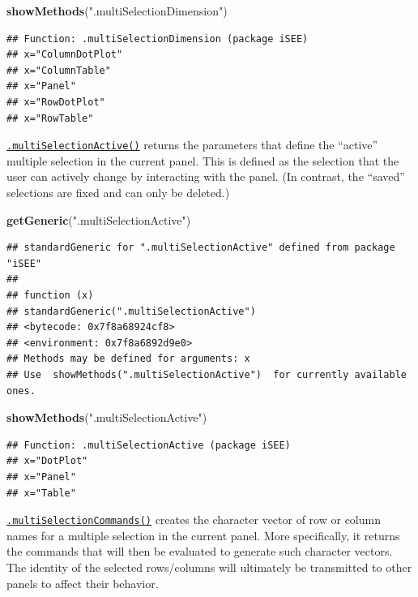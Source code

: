 \documentclass[
]{book}
\newenvironment{Shaded}{\begin{snugshade}}{\end{snugshade}}
\newcommand{\KeywordTok}[1]{\textcolor[rgb]{0.13,0.29,0.53}{\textbf{#1}}}
\newcommand{\NormalTok}[1]{#1}
\newcommand{\StringTok}[1]{\textcolor[rgb]{0.31,0.60,0.02}{#1}}
\begin{document}
\begin{Shaded}
\begin{Highlighting}[]
\KeywordTok{showMethods}\NormalTok{(}\StringTok{".multiSelectionDimension"}\NormalTok{)}
\end{Highlighting}
\end{Shaded}

\begin{verbatim}
## Function: .multiSelectionDimension (package iSEE)
## x="ColumnDotPlot"
## x="ColumnTable"
## x="Panel"
## x="RowDotPlot"
## x="RowTable"
\end{verbatim}

\href{https://isee.github.io/iSEE/reference/multi-select-generics.html}{\texttt{.multiSelectionActive()}} returns the parameters that define the ``active'' multiple selection in the current panel.
This is defined as the selection that the user can actively change by interacting with the panel.
(In contrast, the ``saved'' selections are fixed and can only be deleted.)

\begin{Shaded}
\begin{Highlighting}[]
\KeywordTok{getGeneric}\NormalTok{(}\StringTok{".multiSelectionActive"}\NormalTok{)}
\end{Highlighting}
\end{Shaded}

\begin{verbatim}
## standardGeneric for ".multiSelectionActive" defined from package "iSEE"
## 
## function (x) 
## standardGeneric(".multiSelectionActive")
## <bytecode: 0x7f8a68924cf8>
## <environment: 0x7f8a6892d9e0>
## Methods may be defined for arguments: x
## Use  showMethods(".multiSelectionActive")  for currently available ones.
\end{verbatim}

\begin{Shaded}
\begin{Highlighting}[]
\KeywordTok{showMethods}\NormalTok{(}\StringTok{".multiSelectionActive"}\NormalTok{)}
\end{Highlighting}
\end{Shaded}

\begin{verbatim}
## Function: .multiSelectionActive (package iSEE)
## x="DotPlot"
## x="Panel"
## x="Table"
\end{verbatim}

\href{https://isee.github.io/iSEE/reference/multi-select-generics.html}{\texttt{.multiSelectionCommands()}} creates the character vector of row or column names for a multiple selection in the current panel.
More specifically, it returns the commands that will then be evaluated to generate such character vectors.
The identity of the selected rows/columns will ultimately be transmitted to other panels to affect their behavior.
\end{document}
